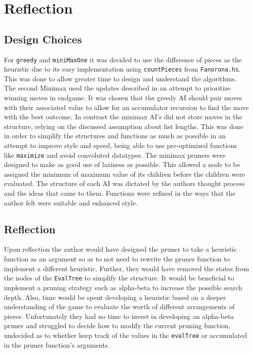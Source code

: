 \documentclass[11pt]{article}
\begin{document}
\newpage
\section{Reflection}
  \subsection*{Design Choices}
  For \verb|greedy| and \verb|miniMaxOne| it was decided to use the difference of pieces as the heuristic due to its easy implementation using \verb|countPieces| from \verb|Fanorona.hs|. This was done to allow greater time to design and understand the algorithms. The second Minimax used the updates described in an attempt to prioritize winning moves in endgame. It was chosen that the greedy AI should pair moves with their associated value to allow for an accumulator recursion to find the move with the best outcome. In contrast the minimax AI's did not store moves in the structure, relying on the discussed assumption about list lengths. This was done in order to simplify the structures and functions as much as possible in an attempt to improve style and speed, being able to use pre-optimized functions like \verb|maximize| and avoid convoluted datatypes. The minimax pruners were designed to make as good use of laziness as possible. This allowed a node to be assigned the minimum of maximum value of its children before the children were evaluated. The structure of each AI was dictated by the authors thought process and the ideas that came to them. Functions were refined in the ways that the author felt were suitable and enhanced style.

  \subsection*{Reflection}
  Upon reflection the author would have designed the pruner to take a heuristic function as an argument so as to not need to rewrite the pruner function to implement a different heuristic. Further, they would have removed the states from the nodes of the \verb|EvalTree| to simplify the structure. It would be beneficial to implement a pruning strategy such as alpha-beta to increase the possible search depth. Also, time would be spent developing a heuristic based on a deeper understanding of the game to evaluate the worth of different arrangements of pieces. Unfortunately they had no time to invest in developing an alpha-beta pruner and struggled to decide how to modify the current pruning function, undecided as to whether keep track of the values in the \verb|evalTree| or accumulated in the pruner function's arguments.




\end{document}
